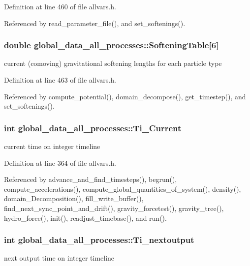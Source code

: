 Definition at line 460 of file allvars.h.



Referenced by read\_\-parameter\_\-file(), and set\_\-softenings().

\hypertarget{structglobal__data__all__processes_a5d557dca41d454bbc34153a0df2a4338}{
\subsubsection[{SofteningTable}]{\setlength{\rightskip}{0pt plus 5cm}double {\bf global\_\-data\_\-all\_\-processes::SofteningTable}\mbox{[}6\mbox{]}}}
\label{structglobal__data__all__processes_a5d557dca41d454bbc34153a0df2a4338}
current (comoving) gravitational softening lengths for each particle type 

Definition at line 463 of file allvars.h.



Referenced by compute\_\-potential(), domain\_\-decompose(), get\_\-timestep(), and set\_\-softenings().

\hypertarget{structglobal__data__all__processes_ab0720db6b598f7295ec843708a1d3c6f}{
\subsubsection[{Ti\_\-Current}]{\setlength{\rightskip}{0pt plus 5cm}int {\bf global\_\-data\_\-all\_\-processes::Ti\_\-Current}}}
\label{structglobal__data__all__processes_ab0720db6b598f7295ec843708a1d3c6f}
current time on integer timeline 

Definition at line 364 of file allvars.h.



Referenced by advance\_\-and\_\-find\_\-timesteps(), begrun(), compute\_\-accelerations(), compute\_\-global\_\-quantities\_\-of\_\-system(), density(), domain\_\-Decomposition(), fill\_\-write\_\-buffer(), find\_\-next\_\-sync\_\-point\_\-and\_\-drift(), gravity\_\-forcetest(), gravity\_\-tree(), hydro\_\-force(), init(), readjust\_\-timebase(), and run().

\hypertarget{structglobal__data__all__processes_af1655016614a8c7ae59520abae300f67}{
\subsubsection[{Ti\_\-nextoutput}]{\setlength{\rightskip}{0pt plus 5cm}int {\bf global\_\-data\_\-all\_\-processes::Ti\_\-nextoutput}}}
\label{structglobal__data__all__processes_af1655016614a8c7ae59520abae300f67}
next output time on integer timeline 

